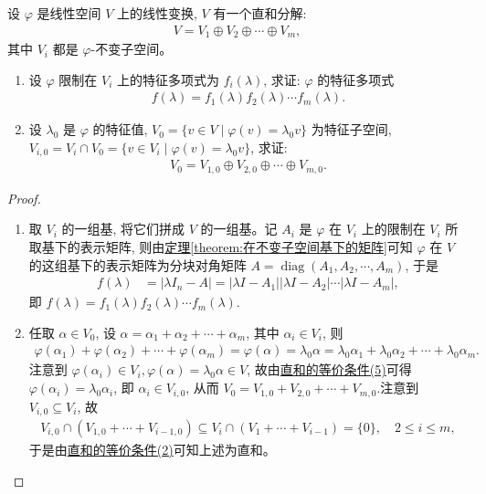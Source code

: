 \documentclass[../../main.tex]{subfiles}
\begin{document}
\begin{proposition}\label{proposition:线性变换不变子空间直和分解与特征值的关系}
设 $\varphi$ 是线性空间 $V$ 上的线性变换, $V$ 有一个直和分解:
\begin{align*}
V = V_1 \oplus V_2 \oplus \cdots \oplus V_m,
\end{align*}
其中 $V_i$ 都是 $\varphi$-不变子空间。
\begin{enumerate}[(1)]
\item 设 $\varphi$ 限制在 $V_i$ 上的特征多项式为 $f_i(\lambda)$, 求证: $\varphi$ 的特征多项式
\begin{align*}
f(\lambda) = f_1(\lambda) f_2(\lambda) \cdots f_m(\lambda).
\end{align*}

\item  设 $\lambda_0$ 是 $\varphi$ 的特征值, $V_0 = \{v \in V \mid \varphi(v) = \lambda_0 v\}$ 为特征子空间, $V_{i,0} = V_i \cap V_0 = \{v \in V_i \mid \varphi(v) = \lambda_0 v\}$, 求证:
\begin{align*}
V_0 = V_{1,0} \oplus V_{2,0} \oplus \cdots \oplus V_{m,0}.
\end{align*}
\end{enumerate}
\end{proposition}
\begin{proof}
\begin{enumerate}[(1)]
\item  取 $V_i$ 的一组基, 将它们拼成 $V$ 的一组基。记 $A_i$ 是 $\varphi$ 在 $V_i$ 上的限制在 $V_i$ 所取基下的表示矩阵, 则由\hyperref[theorem:在不变子空间基下的矩阵]{定理\ref{theorem:在不变子空间基下的矩阵}}可知 $\varphi$ 在 $V$ 的这组基下的表示矩阵为分块对角矩阵 $A = \operatorname{diag}(A_1, A_2, \cdots, A_m)$, 于是
\begin{align*}
f(\lambda) &= |\lambda I_n - A| = |\lambda I - A_1| |\lambda I - A_2| \cdots |\lambda I - A_m|,
\end{align*}
即 $f(\lambda) = f_1(\lambda) f_2(\lambda) \cdots f_m(\lambda)$.

\item 任取 $\alpha \in V_0$, 设 $\alpha = \alpha_1 + \alpha_2 + \cdots + \alpha_m$, 其中 $\alpha_i \in V_i$, 则
\begin{align*}
\varphi(\alpha_1) + \varphi(\alpha_2) + \cdots + \varphi(\alpha_m) = \varphi(\alpha) = \lambda_0 \alpha = \lambda_0 \alpha_1 + \lambda_0 \alpha_2 + \cdots + \lambda_0 \alpha_m.
\end{align*}
注意到 $\varphi(\alpha_i) \in V_i,\varphi(\alpha) = \lambda_0 \alpha\in V$, 故由\hyperref[theorem:直和的等价条件]{直和的等价条件(5)}可得 $\varphi(\alpha_i) = \lambda_0 \alpha_i$, 即 $\alpha_i \in V_{i,0}$, 从而 $V_0=V_{1,0}+V_{2,0}+\cdots +V_{m,0}$.注意到 $V_{i,0} \subseteq V_i$, 故
\begin{align*}
V_{i,0} \cap (V_{1,0} + \cdots + V_{i-1,0}) \subseteq V_i \cap (V_1 + \cdots + V_{i-1}) = \{0\}, \quad 2 \leqslant  i \leqslant  m,
\end{align*}
于是由\hyperref[theorem:直和的等价条件]{直和的等价条件(2)}可知上述为直和。
\end{enumerate}

\end{proof}
\end{document}
